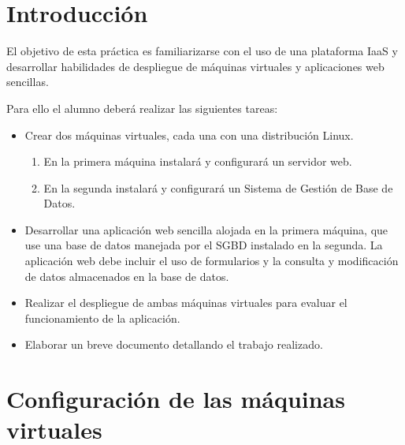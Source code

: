 	
\setcounter{page}{0}



\thispagestyle{empty}

\newpage %

\tableofcontents %


\newpage


\section{Introducción}

El objetivo de esta práctica es familiarizarse con el uso de una plataforma IaaS y desarrollar habilidades de despliegue de máquinas virtuales y aplicaciones web sencillas.

Para ello el alumno deberá realizar las siguientes tareas:

\begin{itemize}
	\item Crear dos máquinas virtuales, cada una con una distribución Linux.
	\begin{enumerate}
		\item En la primera máquina instalará y configurará un servidor web.
		\item En la segunda instalará y configurará un Sistema de Gestión de Base de Datos.
	\end{enumerate}
	\item Desarrollar una aplicación web sencilla alojada en la primera máquina, que use una base de datos manejada por el SGBD instalado en la segunda. La aplicación web debe incluir el uso de formularios y la consulta y modificación de datos almacenados en la base de datos.
	\item Realizar el despliegue de ambas máquinas virtuales para evaluar el funcionamiento de la aplicación.
	\item Elaborar un breve documento detallando el trabajo realizado.

\end{itemize}


\section{Configuración de las máquinas virtuales}

